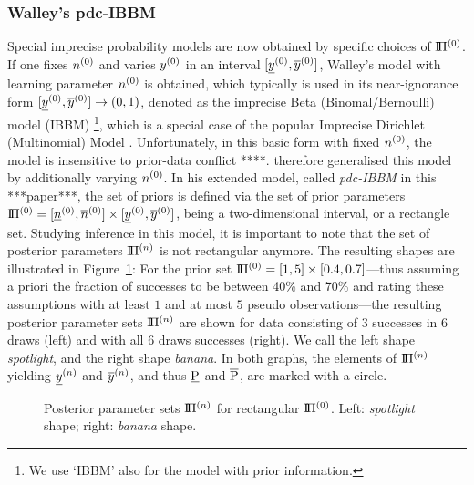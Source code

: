\subsubsection{Walley's pdc-IBBM}
\label{sec:ibbm-walley}

Special imprecise probability models are now obtained by specific
choices of $\text{I}\!\Pi^{(0)}$. If one fixes $n^{(0)}$ and varies $y^{(0)}$ in an interval $[\underline{y}^{(0)},\overline{y}^{(0)}]$,
Walley's \parencite*[\S 5.3]{1991:walley} model with learning parameter $n^{(0)}$ is obtained, which typically
is used in its near-ignorance form $[\underline{y}^{(0)}, \overline{y}^{(0)}] \to (0,1)$,
denoted as the imprecise Beta (Binomal/Bernoulli) model (IBBM)%
\footnote{We use `IBBM' also for the model with prior information.},
which is a special case of the popular Imprecise Dirichlet (Multinomial) Model
\parencite{1996:walley::idm,1999:walleybernard}. Unfortunately, in this basic form with fixed $n^{(0)}$, the model is
insensitive to prior-data conflict \parencite[p.~263]{Walter2009a} ****.
\textcite[\S 5.4]{1991:walley} therefore generalised this
model by additionally varying $n^{(0)}$. In his extended model,
called \emph{pdc-IBBM} in this ***paper***, the set of priors is defined via the
set of prior parameters $\text{I}\!\Pi^{(0)} = [\underline{n}^{(0)}, \overline{n}^{(0)}] \times [\underline{y}^{(0)}, \overline{y}^{(0)}]$,
being a two-dimensional interval, or a rectangle set.
Studying inference in this model, it is important to note that the set of posterior parameters
$\text{I}\!\Pi^{(n)}$ is not rectangular anymore. The resulting shapes are illustrated in Figure~\ref{fig:spot-banana}: For the
prior set $\text{I}\!\Pi^{(0)} = [1, 5 ] \times  [0.4, 0.7]$---thus assuming a priori the
fraction of successes to be between 40\% and 70\% and rating these assumptions
with at least $1$ and at most $5$ pseudo observations---the resulting posterior parameter sets $\text{I}\!\Pi^{(n)}$
are shown for data consisting of 3 successes in 6 draws (left) and with all 6 draws successes (right). %
We call the left shape \emph{spotlight}, and the right shape
\emph{banana}. In both graphs, the elements of $\text{I}\!\Pi^{(n)}$ yielding
$\underline{y}^{(n)}$ and $\overline{y}^{(n)}$, and thus $\underline{\operatorname{P}}$ and $\overline{\operatorname{P}}$,
are marked with a circle.

\begin{figure}[t]
\caption{Posterior parameter sets $\text{I}\!\Pi^{(n)}$ for rectangular $\text{I}\!\Pi^{(0)}$. Left: \emph{spotlight} shape; right: \emph{banana} shape.}
\label{fig:spot-banana}
\end{figure}

